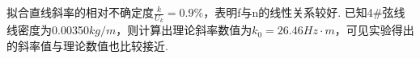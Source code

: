 \documentclass[UTF8]{ctexart}
\begin{document}
\begin{figure}[H]\centering{}
\end{figure}
拟合直线斜率的相对不确定度$\frac{k}{U_k} = 0.9\%$，表明f与n的线性关系较好. 已知4\#弦线线密度为0.00350$kg/m$，则计算出理论斜率数值为$k_0=26.46Hz\cdot m$，可见实验得出的斜率值与理论数值也比较接近.
\end{document}

